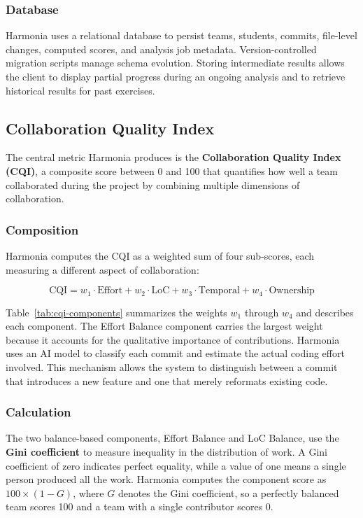 \documentclass[sigconf]{acmart}
\begin{document}
\subsubsection{Database}

Harmonia uses a relational database to persist teams, students, commits, file-level changes, computed scores, and analysis job metadata. Version-controlled migration scripts manage schema evolution. Storing intermediate results allows the client to display partial progress during an ongoing analysis and to retrieve historical results for past exercises.

\subsection{Collaboration Quality Index}
\label{sec:cqi}

The central metric Harmonia produces is the \textbf{Collaboration Quality Index (CQI)}, a composite score between 0 and 100 that quantifies how well a team collaborated during the project by combining multiple dimensions of collaboration.

\subsubsection{Composition}

Harmonia computes the CQI as a weighted sum of four sub-scores, each measuring a different aspect of collaboration:

\begin{equation}
\text{CQI} = w_1 \cdot \text{Effort} + w_2 \cdot \text{LoC} + w_3 \cdot \text{Temporal} + w_4 \cdot \text{Ownership}
\end{equation}

Table~\ref{tab:cqi-components} summarizes the weights $w_1$ through $w_4$ and describes each component. The Effort Balance component carries the largest weight because it accounts for the qualitative importance of contributions. Harmonia uses an AI model to classify each commit and estimate the actual coding effort involved. This mechanism allows the system to distinguish between a commit that introduces a new feature and one that merely reformats existing code.

\subsubsection{Calculation}

The two balance-based components, Effort Balance and LoC Balance, use the \textbf{Gini coefficient} to measure inequality in the distribution of work. A Gini coefficient of zero indicates perfect equality, while a value of one means a single person produced all the work. Harmonia computes the component score as $100 \times (1 - G)$, where $G$ denotes the Gini coefficient, so a perfectly balanced team scores 100 and a team with a single contributor scores 0.
\end{document}
